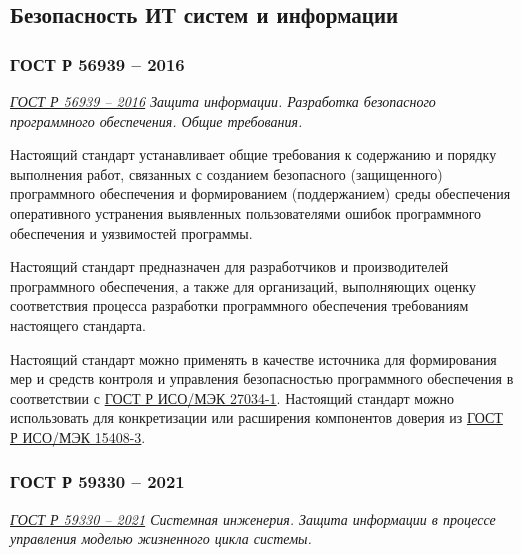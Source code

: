 
\subsection{Безопасность ИТ систем и информации}

\subsubsection{ГОСТ Р 56939 -- 2016}

\emph{\href{https://docs.cntd.ru/document/1200135525}{ГОСТ Р 56939 -- 2016}
Защита информации.
Разработка безопасного программного обеспечения.
Общие требования.
}

Настоящий стандарт устанавливает общие требования к содержанию
и порядку выполнения работ, связанных с созданием безопасного (защищенного)
программного обеспечения и формированием (поддержанием)
среды обеспечения оперативного устранения выявленных пользователями
ошибок программного обеспечения и уязвимостей программы.

Настоящий стандарт предназначен для разработчиков
и производителей программного обеспечения, а также для организаций,
выполняющих оценку соответствия процесса разработки
программного обеспечения требованиям настоящего стандарта.

Настоящий стандарт можно применять в качестве источника для формирования мер
и средств контроля и управления безопасностью программного обеспечения
в соответствии с
\href{https://docs.cntd.ru/document/1200112883}{ГОСТ Р ИСО/МЭК 27034-1}.
Настоящий стандарт можно использовать для конкретизации
или расширения компонентов доверия из
\href{https://docs.cntd.ru/document/1200105711}{ГОСТ Р ИСО/МЭК 15408-3}.

\subsubsection{ГОСТ Р 59330 -- 2021}

\emph{\href{https://docs.cntd.ru/document/1200179342}{ГОСТ Р 59330 -- 2021}
Системная инженерия.
Защита информации в процессе управления моделью жизненного цикла системы.
}

